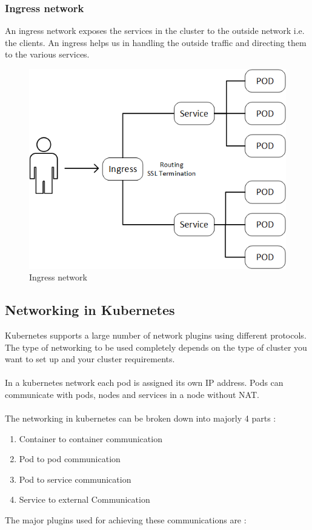 \documentclass[12pt]{article}
\begin{document}
\subsubsection{Ingress network}
An ingress network exposes the services in the cluster to the outside network i.e. the clients. An ingress helps us in handling the outside traffic and directing them to the various services.\\
\begin{figure}[h!]
	\begin{center}
		\includegraphics[totalheight=0.31\textheight]{ingress}
		\caption{Ingress network}
	\end{center}
\end{figure}
\subsection{Networking in Kubernetes}
Kubernetes supports a large number of network  plugins using different protocols. The type of networking to be used completely depends on the type of cluster you want to set up and your cluster requirements.\\\\
In a kubernetes network each pod is assigned its own IP address. Pods can communicate with pods, nodes and services in a node without NAT. \\\\
The networking in kubernetes can be broken down into majorly 4 parts :
\begin{enumerate}
	\item Container to container communication
	\item Pod to pod communication
	\item Pod to service communication
	\item Service to external Communication
\end{enumerate}
The major plugins used for achieving these communications are :
\end{document}
